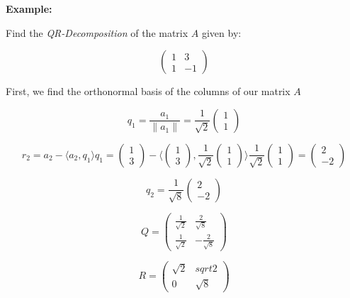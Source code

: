 \textbf{Example:}
\vspace{\baselineskip}

Find the \emph{QR-Decomposition} of the matrix \(A\) given by:

\[
    \begin{pmatrix}
        1 & 3 \\
        1 & -1 
    \end{pmatrix}
\]

First, we find the orthonormal basis of the columns of our matrix \(A\) 

\[ 
    q_1 = \frac{a_1}{\|a_1\|} = \frac{1}{\sqrt{2}} \begin{pmatrix} 1 \\ 1 \end{pmatrix}
\]

\[ 
    r_2 = a_2 - \langle a_2, q_1\rangle q_1 
    = 
    \begin{pmatrix} 1 \\ 3 \end{pmatrix}
    - 
    \langle  
    \begin{pmatrix} 1 \\ 3 \end{pmatrix}
    ,
    \frac{1}{\sqrt{2}} \begin{pmatrix} 1 \\ 1 \end{pmatrix}
    \rangle    
    \frac{1}{\sqrt{2}} 
    \begin{pmatrix} 1 \\ 1 \end{pmatrix}
    = 
    \begin{pmatrix}
        2 \\ -2 
    \end{pmatrix}
\]

\[
    q_2 =
    \frac{1}{\sqrt{8}}
    \begin{pmatrix}
        2 \\ -2 
    \end{pmatrix}
\]

\[
Q = 
\begin{pmatrix}
    \frac{1}{\sqrt{2}} & \frac{2}{\sqrt{8}} \\
    \frac{1}{\sqrt{2}} & -\frac{2}{\sqrt{8}}
\end{pmatrix}
\]

\[
R =
\begin{pmatrix}
    \sqrt{2} & sqrt{2} \\
     0    &    \sqrt{8}
\end{pmatrix}
\]





